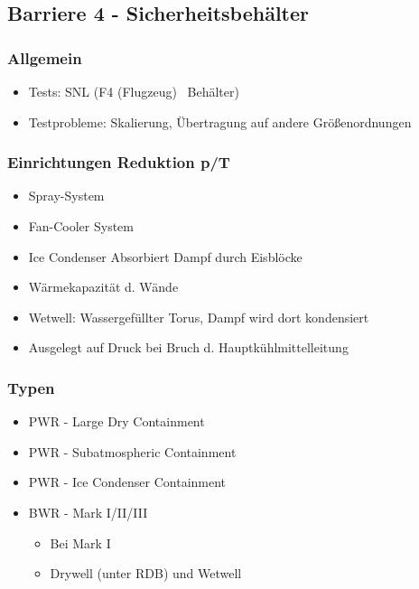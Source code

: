 \documentclass[12pt]{article}
\begin{document}
\subsection{Barriere 4 - Sicherheitsbehälter}

\subsubsection{Allgemein}
\begin{itemize}
	\item Tests: SNL (F4 (Flugzeug) \textrightarrow\ Behälter)
	\item Testprobleme: Skalierung, Übertragung auf andere Größenordnungen
\end{itemize}

\subsubsection{Einrichtungen Reduktion p/T}
\begin{itemize}
	\item Spray-System
	\item Fan-Cooler System
	\item Ice Condenser \textrightarrow Absorbiert Dampf durch Eisblöcke
	\item Wärmekapazität d. Wände
	\item Wetwell: Wassergefüllter Torus, Dampf wird dort kondensiert
	\item Ausgelegt auf Druck bei Bruch d. Hauptkühlmittelleitung
\end{itemize}

\subsubsection{Typen}
\begin{itemize}
	\item PWR - Large Dry Containment
	\item PWR - Subatmospheric Containment
	\item PWR - Ice Condenser Containment
	\item BWR - Mark I/II/III
		\begin{itemize}
			\item Bei Mark I
			\item Drywell (unter RDB) und Wetwell
		\end{itemize}
\end{itemize}
\end{document}
